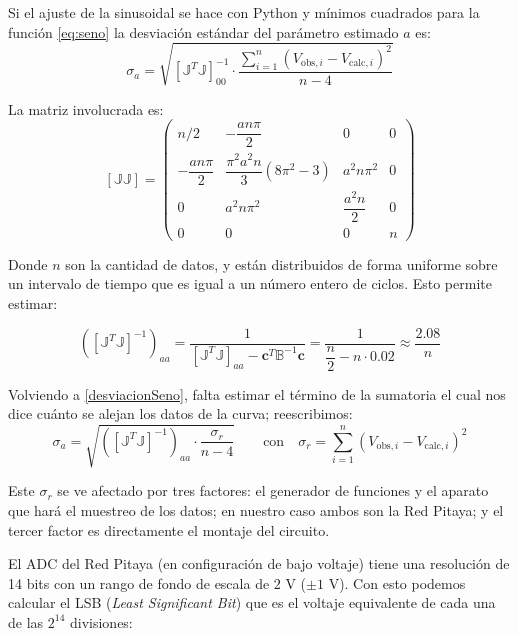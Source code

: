 Si el ajuste de la sinusoidal se hace con Python y mínimos cuadrados para la función \eqref{eq:seno} la desviación estándar del parámetro estimado $a$ es:
\begin{equation}
    \sigma_a = \sqrt{\left[\mathbb{J}^T \mathbb{J}\right]^{-1}_{00} \cdot \frac{\sum_{i=1}^{n}(V_{\text{obs},i} - V_{\text{calc},i})^2}{n-4}} \label{desviacionSeno}
\end{equation}

La matriz involucrada es:
\begin{equation}
    \left[\mathbb{J}\mathbb{J}\right] =
    \begin{pmatrix}
        n/2 & -\dfrac{an\pi}{2} & 0 & 0 \\[10pt]
        -\dfrac{an\pi}{2} & \dfrac{\pi^2 a^2 n}{3}(8\pi^2-3) & a^2 n\pi^2 & 0 \\[10pt]
        0 & a^2 n\pi^2 & \dfrac{a^2 n}{2} & 0 \\[10pt]
        0 & 0 & 0 & n
    \end{pmatrix}
\end{equation}

 Donde $n$ son la cantidad de datos, y están distribuidos de forma uniforme sobre un intervalo de tiempo que es igual a un número entero de ciclos. Esto permite estimar:

\begin{equation}
    \left(\left[\mathbb{J}^T \mathbb{J}\right]^{-1}\right)_{aa}
    = \frac{1}{\left[\mathbb{J}^T \mathbb{J}\right]_{aa} - \mathbf{c}^T \mathbb{B}^{-1}\mathbf{c}}
    = \frac{1}{\dfrac{n}{2} - n\cdot 0.02}
    \approx \frac{2.08}{n}
\end{equation}

Volviendo a \eqref{desviacionSeno}, falta estimar el término de la sumatoria el cual nos dice cuánto se alejan los datos de la curva; reescribimos:
\begin{equation}
    \sigma_a = \sqrt{\left(\left[\mathbb{J}^T \mathbb{J}\right]^{-1}\right)_{aa} \cdot \frac{\sigma_r}{n-4}}
    \qquad \text{con} \quad \sigma_r = \sum_{i=1}^{n}(V_{\text{obs},i} - V_{\text{calc},i})^2 \tag{23}
\end{equation}

Este $\sigma_r$ se ve afectado por tres factores: el generador de funciones y el aparato que hará el muestreo de los datos; en nuestro caso ambos son la Red Pitaya; y el tercer factor es directamente el montaje del circuito.

El ADC del Red Pitaya (en configuración de bajo voltaje) tiene una resolución de 14 bits con un rango de fondo de escala de $2\text{ V}$ ($\pm1\text{ V}$). Con esto podemos calcular el LSB (\textit{Least Significant Bit}) que es el voltaje equivalente de cada una de las $2^{14}$ divisiones:

